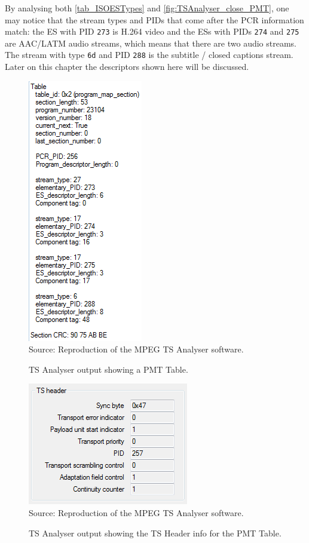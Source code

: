 \documentclass[
	12pt,				%
	openright,			%
	twoside,			%
	a4paper,			%
	brazil,
	french,				%
	english
	]{abntex2}
\begin{document}
\begin{apendicesenv}
By analysing both \autoref{tab_ISOESTypes} and \autoref{fig:TSAnalyser_close_PMT}, one may notice that the stream types and PIDs that come after the PCR information match: the ES with PID \texttt{273} is H.264 video and the ESs with PIDs \texttt{274} and \texttt{275} are AAC/LATM audio streams, which means that there are two audio streams. The stream with type \texttt{6d} and PID \texttt{288} is the subtitle / closed captions stream. Later on this chapter the descriptors shown here will be discussed.

\begin{figure}[!hb]
\centering
\caption{TS Analyser output showing a PMT Table.}
\includegraphics[width=0.4\linewidth]{figuras/TSAnalyser_close_PMT.png}
\\Source: Reproduction of the MPEG TS Analyser software.
\label{fig:TSAnalyser_close_PMT}
\end{figure}

\begin{figure}[!hb]
\centering
\caption{TS Analyser output showing the TS Header info for the PMT Table.}
\includegraphics[width=0.4\linewidth]{figuras/TSAnalyser_close_PMT_TS_Header.png}
\\Source: Reproduction of the MPEG TS Analyser software.
\label{fig:TSAnalyser_close_PMT_TS_Header}
\end{figure}


\end{apendicesenv}
\end{document}
